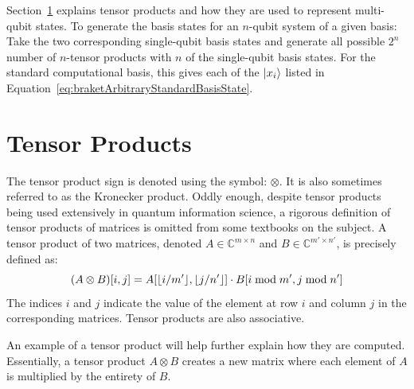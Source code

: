 Section~\ref{sec:tensorProducts} explains tensor products and how they are used to represent multi-qubit states. To generate the basis states for an $n$-qubit system of a given basis: Take the two corresponding single-qubit basis states and generate all possible $2^n$ number of $n$-tensor products with $n$ of the single-qubit basis states. For the standard computational basis, this gives each of the $\ket{x_i}$ listed in Equation~\eqref{eq:braketArbitraryStandardBasisState}.
\section{Tensor Products}
\label{sec:tensorProducts}
The tensor product sign is denoted using the symbol: $\otimes$. It is also sometimes referred to as the Kronecker product. Oddly enough, despite tensor products being used extensively in quantum information science, a rigorous definition of tensor products of matrices is omitted from some textbooks on the subject. A tensor product of two matrices, denoted $A \in \mathbb{C}^{m \times n}$ and $B \in \mathbb{C}^{m' \times n'}$, is precisely defined as: $$(A \otimes B)[i,j] = A[\lfloor i/m'\rfloor,\lfloor j/n'\rfloor] \cdot B[i \bmod m', j \bmod n']$$
The indices $i$ and $j$ indicate the value of the element at row $i$ and column $j$ in the corresponding matrices. Tensor products are also associative.

An example of a tensor product will help further explain how they are computed. Essentially, a tensor product $A \otimes B$ creates a new matrix where each element of $A$ is multiplied by the entirety of $B$.

